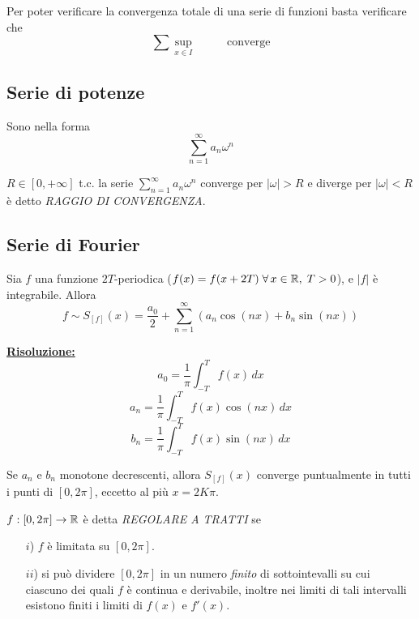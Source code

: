 Per poter verificare la convergenza totale di una serie di funzioni basta verificare che
\[
    \sum \underset{x \in I}{\sup} \mspace{50mu} \mbox{converge}
\]

\subsection{Serie di potenze}
Sono nella forma
\begin{equation}
    \sum_{n=1}^\infty a_n \omega^n
\end{equation}

\begin{definition}
    $R \in [0, +\infty]$ t.c. la serie $\sum_{n=1}^\infty a_n \omega^n$ converge per $|\omega| > R$ e diverge per $|\omega| < R$ è detto \emph{RAGGIO DI CONVERGENZA}.
\end{definition}


\subsection{Serie di Fourier}
Sia $f$ una funzione $2 T$-periodica ($f(x) = f(x+2T) \; \forall\, x \in \mathbb{R}, \; T> 0$), e $|f|$ è integrabile. Allora
\begin{equation}
    f \sim S_{[f]}(x) = \frac{a_0}{2} + \sum_{n=1}^\infty (a_n \cos(nx) + b_n \sin(nx))
\end{equation}

\underline{\textbf{Risoluzione:}}
\begin{equation}
    a_0 = \frac{1}{\pi}\int_{-T}^{T} f(x) \,dx
\end{equation}
\begin{equation}
    a_n = \frac{1}{\pi}\int_{-T}^{T} f(x) \cos(nx) \,dx
\end{equation}
\begin{equation}
    b_n = \frac{1}{\pi}\int_{-T}^{T} f(x) \sin(nx) \,dx
\end{equation}

\begin{theorem}
    Se ${a_n}$ e ${b_n}$ monotone decrescenti, allora $S_{[f]}(x)$ converge puntualmente in tutti i punti di $[0, 2\pi]$, eccetto al più $x=2K\pi$.
\end{theorem}

\begin{definition}
    $f:[0, 2\pi] \to \mathbb{R}$ è detta \emph{REGOLARE A TRATTI} se 
    \begin{itemize}
        \item [$i$)] $f$ è limitata su $[0, 2\pi]$.
        \item [$ii$)] si può dividere $[0, 2\pi]$ in un numero \emph{finito} di sottointevalli su cui ciascuno dei quali $f$ è continua e derivabile, inoltre nei limiti di tali intervalli esistono finiti i limiti di $f(x)$ e $f'(x)$.
    \end{itemize} 
\end{definition}

